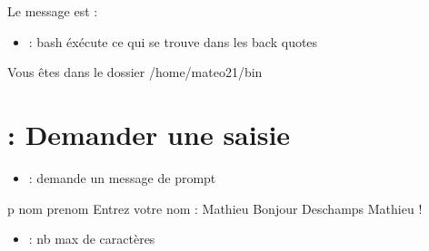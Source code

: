 \documentclass[letterpaper,10pt,french]{sphinxmanual}
\begin{document}
%
\begin{sphinxVerbatim}[commandchars=\\\{\}]
\PYGZdl{} 
\PYGZdl{}  
Le message est : 
\end{sphinxVerbatim}
\begin{itemize}
\item {} 
 : bash éxécute ce qui se trouve dans les back quotes 

\end{itemize}

%
\begin{sphinxVerbatim}[commandchars=\\\{\}]
\PYGZdl{} 
\PYGZdl{}  
Vous êtes dans le dossier /home/mateo21/bin
\end{sphinxVerbatim}


\section{ : Demander une saisie}
\label{\detokenize{21-scripts-shell:read-demander-une-saisie}}\begin{itemize}
\item {} 
 : demande un message de prompt

\end{itemize}

%
\begin{sphinxVerbatim}[commandchars=\\\{\}]
\PYGZdl{}  \PYGZhy{}p  nom prenom
\PYGZdl{}  
Entrez votre nom : Mathieu
Bonjour Deschamps Mathieu !
\end{sphinxVerbatim}
\begin{itemize}
\item {} 
 : nb max de caractères

\end{itemize}
\end{document}
